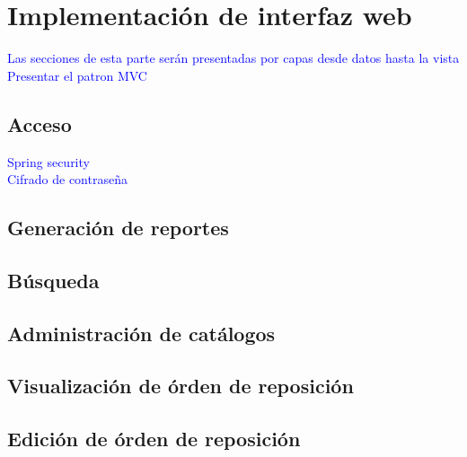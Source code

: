 \section{Implementación de interfaz web}
\textcolor{blue}{Las secciones de esta parte serán presentadas por capas desde datos hasta la vista}\\
\textcolor{blue}{Presentar el patron MVC}\\
\subsection{Acceso}
\textcolor{blue}{Spring security}\\
\textcolor{blue}{Cifrado de contraseña}\\
\subsection{Generación de reportes}
\subsection{Búsqueda}

\subsection{Administración de catálogos}

\subsection{Visualización de órden de reposición}

\subsection{Edición de órden de reposición}
